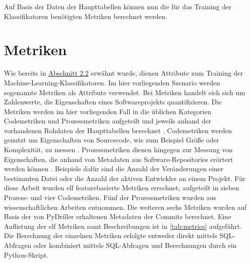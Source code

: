 Auf Basis der Daten der Haupttabellen können nun die für das Training der Klassifikatoren benötigten Metriken berechnet werden.

\section{Metriken}

Wie bereits in \hyperref[classification]{Abschnitt 2.2} erwähnt wurde, dienen Attribute zum Training der Machine-Learning-Klassifikatoren. Im hier vorliegenden Szenario werden sogenannte Metriken als Attribute verwendet. Bei Metriken handelt sich sich um Zahlenwerte, die Eigenschaften eines Softwareprojekts quantifizieren. Die Metriken werden im hier vorliegenden Fall in die üblichen Kategorien Codemetriken und Prozessmetriken aufgeteilt und jeweils anhand der vorhandenen Rohdaten der Haupttabellen berechnet \cite{Rahman2013}. Codemetriken werden genutzt um Eigenschaften von Sourcecode, wie zum Beispiel \glqq Größe\grqq{} oder Komplexität, zu messen \cite{Rahman2013}. Prozessmetriken dienen hingegen zur Messung von Eigenschaften, die anhand von Metadaten aus Software-Repositories erörtert werden können \cite{Rahman2013}. Beispiele dafür sind die Anzahl der Veränderungen einer bestimmten Datei oder die Anzahl der aktiven Entwickler an einem Projekt. Für diese Arbeit wurden elf featurebasierte Metriken errechnet, aufgeteilt in sieben Prozess- und vier Codemetriken. Fünf der Prozessmetriken wurden aus wissenschaftlichen Arbeiten \cite{Rahman2013,Queiroz2016} entnommen. Die weiteren sechs Metriken wurden auf Basis der von PyDriller erhaltenen Metadaten der Commits berechnet. Eine Auflistung der elf Metriken samt Beschreibungen ist in \autoref{tab:metrics} aufgeführt. Die Berechnung der einzelnen Metriken erfolgte entweder direkt mittels SQL-Abfragen oder kombiniert mittels SQL-Abfragen und Berechnungen durch ein Python-Skript.

